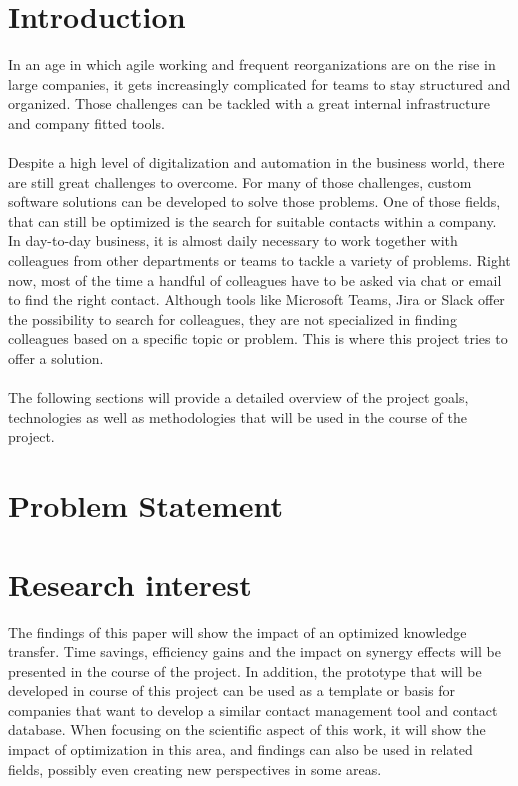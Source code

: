 \newpage
\section{Introduction}
In an age in which agile working and frequent reorganizations are on the rise 
in large companies, it gets increasingly complicated for teams to stay structured 
and organized. Those challenges can be tackled with a great internal infrastructure 
and company fitted tools.
\\
\\
Despite a high level of digitalization and automation in the business world, there are still 
great challenges to overcome. For many of those challenges, custom software solutions can 
be developed to solve those problems. One of those fields, that can still be optimized is 
the search for suitable contacts within a company. In day-to-day business, it is almost 
daily necessary to work together with colleagues from other departments or teams to tackle 
a variety of problems. Right now, most of the time a handful of colleagues have to be asked
via chat or email to find the right contact. Although tools like Microsoft Teams, Jira or 
Slack offer the possibility to search for colleagues, they are not specialized in finding colleagues
based on a specific topic or problem. This is where this project tries to offer a solution.\\
\\
The following sections will provide a detailed overview of the project goals, technologies as 
well as methodologies that will be used in the course of the project.

\section{Problem Statement}


  
\section{Research interest}
The findings of this paper will show the impact of an optimized knowledge transfer. Time savings, 
efficiency gains and the impact on synergy effects will be presented in the course of the project.
In addition, the prototype that will be developed in course of this project can be used as a template
or basis for companies that want to develop a similar contact management tool and contact database.
When focusing on the scientific aspect of this work, it will show the impact of optimization in this area,
and findings can also be used in related fields, possibly even creating new perspectives in some areas.



